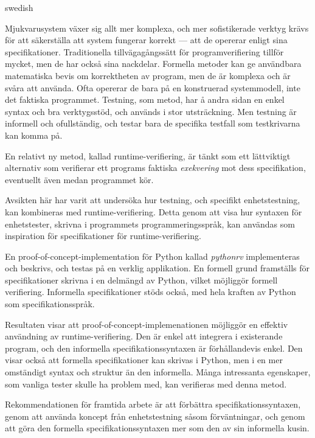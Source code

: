 \begin{foreignabstract}{swedish}

Mjukvarusystem växer sig allt mer komplexa, och mer sofistikerade verktyg
krävs för att säkerställa att system fungerar korrekt --- att de opererar
enligt sina specifikationer. Traditionella tillvägagångssätt för
programverifiering tillför mycket, men de har också sina nackdelar. Formella
metoder kan ge användbara matematiska bevis om korrektheten av program, men de
är komplexa och är svåra att använda. Ofta opererar de bara på en
konstruerad systemmodell, inte det faktiska programmet. Testning, som metod,
har å andra sidan en enkel syntax och bra verktygsstöd, och används i stor
utsträckning. Men testning är informell och ofullständig, och testar bara de
specifika testfall som testkrivarna kan komma på.

En relativt ny metod, kallad runtime-verifiering, är tänkt som ett lättviktigt
alternativ som verifierar ett programs faktiska \textit{exekvering} mot dess
specifikation, eventuellt även medan programmet kör.

Avsikten här har varit att undersöka hur testning, och specifikt
enhetstestning, kan kombineras med runtime-verifiering. Detta genom att visa
hur syntaxen för enhetstester, skrivna i programmets programmeringsspråk, kan
användas som inspiration för specifikationer för runtime-verifiering.

En proof-of-concept-implementation för Python kallad \textit{pythonrv}
implementeras och beskrivs, och testas på en verklig applikation. En formell
grund framställs för specifikationer skrivna i en delmängd av Python, vilket
möjliggör formell verifiering. Informella specifikationer stöds också, med hela
kraften av Python som specifikationsspråk.

Resultaten visar att proof-of-concept-implemenationen möjliggör en effektiv
användning av runtime-verifiering. Den är enkel att integrera i existerande
program, och den informella specifikationssyntaxen är förhållandevis enkel. Den
visar också att formella specifikationer kan skrivas i Python, men i en mer
omständigt syntax och struktur än den informella. Många intressanta egenskaper,
som vanliga tester skulle ha problem med, kan verifieras med denna metod.

Rekommendationen för framtida arbete är att förbättra specifikationssyntaxen,
genom att använda koncept från enhetstestning såsom förväntningar, och genom
att göra den formella specifikationssyntaxen mer som den av sin informella
kusin.

\end{foreignabstract}
